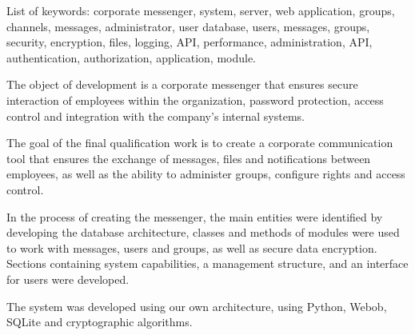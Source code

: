 List of keywords: corporate messenger, system, server, web application, groups, channels, messages, administrator, user database, users, messages, groups, security, encryption, files, logging, API, performance, administration, API, authentication, authorization, application, module.

The object of development is a corporate messenger that ensures secure interaction of employees within the organization, password protection, access control and integration with the company's internal systems.

The goal of the final qualification work is to create a corporate communication tool that ensures the exchange of messages, files and notifications between employees, as well as the ability to administer groups, configure rights and access control.

In the process of creating the messenger, the main entities were identified by developing the database architecture, classes and methods of modules were used to work with messages, users and groups, as well as secure data encryption. Sections containing system capabilities, a management structure, and an interface for users were developed.

The system was developed using our own architecture, using Python, Webob, SQLite and cryptographic algorithms.

